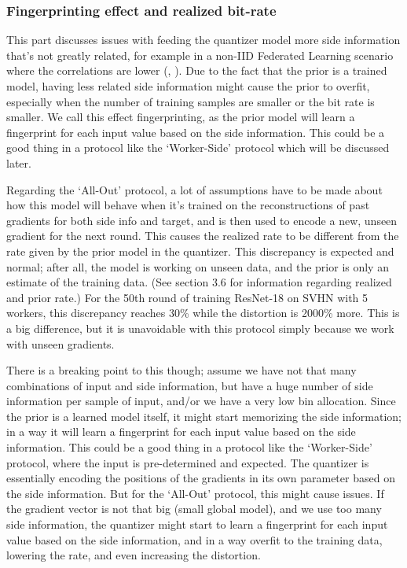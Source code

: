 \subsubsection{Fingerprinting effect and realized bit-rate}
This part discusses issues with feeding the quantizer model more side information that's not greatly related, for example in a non-IID Federated Learning scenario where the correlations are lower (\cite{ZhangTao2022}, \cite{zhang2024tacklingnoniid}). Due to the fact that the prior is a trained model, having less related side information might cause the prior to overfit, especially when the number of training samples are smaller or the bit rate is smaller. We call this effect fingerprinting, as the prior model will learn a fingerprint for each input value based on the side information. This could be a good thing in a protocol like the `Worker-Side' protocol which will be discussed later.

Regarding the `All-Out' protocol, a lot of assumptions have to be made about how this model will behave when it's trained on the reconstructions of past gradients for both side info and target, and is then used to encode a new, unseen gradient for the next round. This causes the realized rate to be different from the rate given by the prior model in the quantizer. This discrepancy is expected and normal; after all, the model is working on unseen data, and the prior is only an estimate of the training data. (See section 3.6 for information regarding realized and prior rate.) For the 50th round of training ResNet-18 on SVHN with 5 workers, this discrepancy reaches 30\% while the distortion is 2000\% more. This is a big difference, but it is unavoidable with this protocol simply because we work with unseen gradients.

There is a breaking point to this though; assume we have not that many combinations of input and side information, but have a huge number of side information per sample of input, and/or we have a very low bin allocation. Since the prior is a learned model itself, it might start memorizing the side information; in a way it will learn a fingerprint for each input value based on the side information. This could be a good thing in a protocol like the `Worker-Side' protocol, where the input is pre-determined and expected. The quantizer is essentially encoding the positions of the gradients in its own parameter based on the side information. But for the `All-Out' protocol, this might cause issues. If the gradient vector is not that big (small global model), and we use too many side information, the quantizer might start to learn a fingerprint for each input value based on the side information, and in a way overfit to the training data, lowering the rate, and even increasing the distortion.

